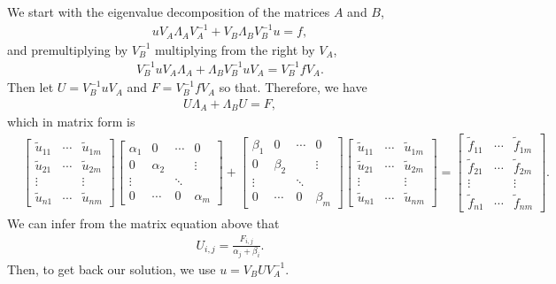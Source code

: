 We start with the eigenvalue decomposition of the matrices $A$ and $B$,
\begin{align*}
uV_A \Lambda_AV_A^{-1} + V_B \Lambda_BV_B^{-1} u = f,
\end{align*}
and premultiplying by $V_B^{-1}$ multiplying from the right by $V_A$,
\begin{align*}
V_B^{-1}uV_A\Lambda_A + \Lambda_B V_B^{-1} u V_A = V_B^{-1} f V_A.
\end{align*}
Then let $U = V_B^{-1}uV_A$ and $F = V_B^{-1} f V_A$ so that. Therefore, we have
\begin{align*}
U\Lambda_A + \Lambda_B U = F,
\end{align*}
which in matrix form is
\begin{align*}
&\begin{bmatrix}
\tilde{u}_{11}& \cdots & \tilde{u}_{1m} \\
\tilde{u}_{21}& \cdots & \tilde{u}_{2m} \\
\vdots& ~ & \vdots \\
\tilde{u}_{n1}& \cdots & \tilde{u}_{nm}
\end{bmatrix} \begin{bmatrix}
\alpha_1 & 0 & \cdots & 0 \\
0 & \alpha_2 & ~ & \vdots \\
\vdots & ~& \ddots & ~ \\
0 & \cdots & 0 & \alpha_m
\end{bmatrix} + \begin{bmatrix}
\beta_1 & 0 & \cdots & 0 \\
0 & \beta_2 & ~ & \vdots \\
\vdots & ~& \ddots & ~ \\
0 & \cdots & 0 & \beta_m
\end{bmatrix}\begin{bmatrix}
\tilde{u}_{11}& \cdots & \tilde{u}_{1m} \\
\tilde{u}_{21} & \cdots & \tilde{u}_{2m} \\
\vdots& ~ & \vdots \\
\tilde{u}_{n1} & \cdots & \tilde{u}_{nm}
\end{bmatrix} = \begin{bmatrix}
\tilde{f}_{11} & \cdots & \tilde{f}_{1m} \\
\tilde{f}_{21} & \cdots & \tilde{f}_{2m} \\
\vdots & ~ & \vdots \\
\tilde{f}_{n1} & \cdots & \tilde{f}_{nm}
\end{bmatrix}.
\end{align*}
We can infer from the matrix equation above that
\begin{align*}
U_{i,j} = \frac{F_{i,j}}{\alpha_j + \beta_i}.
\end{align*}
Then, to get back our solution, we use $u = V_B U V_A^{-1}$.

